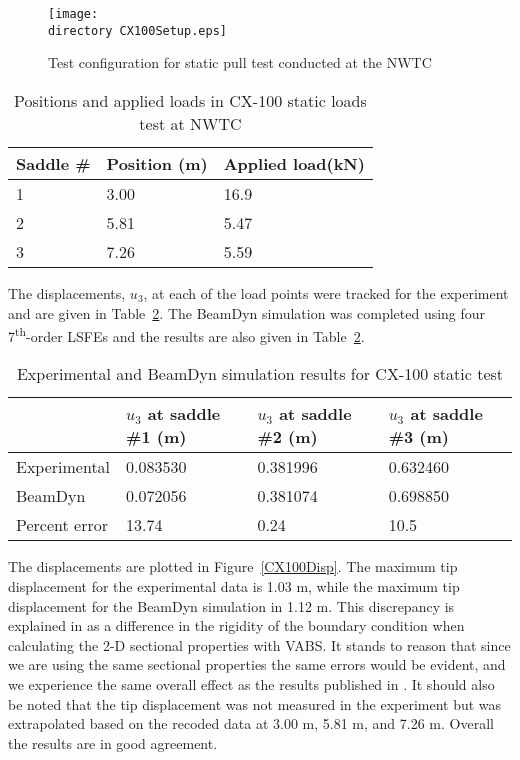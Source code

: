 \documentclass{aiaa-tc}
\def\directory{EPSF/}
\begin{document}
\begin{figure}
\centering
\texttt{[image: \\directory CX100Setup.eps]}
\caption{Test configuration for static pull test conducted at the NWTC \cite{paquette2006modeling}} 
\label{CX100Setup}
\end{figure}

\begin{table} 
\caption{\label{CX100Load}Positions and applied loads in CX-100 static loads test at NWTC  } 
\begin{center}
    \begin{tabular}{| l | l |l |}
    	\hline
    	 Saddle \# &     Position (m) & Applied load(kN)  \\ \hline
    1&	3.00 & 16.9         \\  \hline
    2&	5.81   & 5.47         \\ \hline
    3&	    	7.26   & 5.59         \\ \hline
    \end{tabular}
\end{center}
\end{table}

The displacements, $u_3$, at each of the load points were tracked for the experiment and are given in Table~\ref{CX100Results}. The BeamDyn simulation was completed using four 7\textsuperscript{th}-order LSFEs and the results are also given in Table~\ref{CX100Results}.

\begin{table}
\caption{\label{CX100Results}Experimental and BeamDyn simulation results for CX-100 static test  } 
\begin{center}
    \begin{tabular}{| l | l | l | l |}
    	\hline
    	             & $u_3$ at saddle \#1 (m) & $u_3$ at saddle \#2 (m) & $u_3$ at saddle \#3 (m) \\ \hline
    	Experimental & 0.083530             & 0.381996               & 0.632460             \\ \hline
    	BeamDyn      & 0.072056               & 0.381074                & 0.698850           \\ \hline
    	    	Percent error      &        13.74        & 0.24                & 10.5           \\ \hline
    \end{tabular}
\end{center}
\end{table} 
The displacements are plotted in Figure~\ref{CX100Disp}. The maximum tip displacement for the experimental data is 1.03 m, while the maximum tip displacement for the BeamDyn simulation in 1.12 m. This discrepancy is explained in \cite{Luscher:2013} as a difference in the rigidity of the boundary condition when calculating the 2-D sectional properties with VABS. It stands to reason that since we are using the same sectional properties the same errors would be evident, and we experience the same overall effect as the results published in \cite{Luscher:2013}. It should also be noted that the tip displacement was not measured in the experiment but was extrapolated based on the recoded data at 3.00 m, 5.81 m, and 7.26 m. Overall the results are in good agreement.
\end{document}
